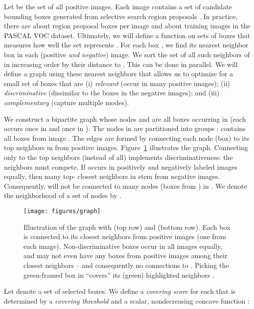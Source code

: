 \documentclass{article}
\begin{document}
Let  be the set of all positive images. Each image contains a set  of candidate bounding boxes generated from selective search region proposals \cite{selectivesearch}. In practice, there are about  region proposal boxes per image and about  training images in the PASCAL VOC dataset. Ultimately, we will define a function  on sets  of boxes that measures how well the set  represents .
For each box , we find its nearest neighbor box in each (positive \emph{and negative}) image. We sort the set  of all such neighbors of  in increasing order by their distance to . This can be done in parallel.
We will define a graph using these nearest neighbors that allows us to optimize for a small set of boxes  that are (i) \emph{relevant} (occur in many positive images); (ii) \emph{discriminative} (dissimilar to the boxes in the negative images); and (iii) \emph{complementary} (capture multiple modes).



We construct a bipartite graph  whose nodes  and  are all boxes occurring in  (each  occurs once in  and once in ). The nodes in  are partitioned into groups :  contains all boxes from image . The edges  are formed by connecting each node (box)  to its top  neighbors in  from positive images. 
Figure~\ref{fig:graph} illustrates the graph.
Connecting only to the top  neighbors (instead of all) implements discriminativeness: the neighbors must compete. If  occurs in positively and negatively labeled images equally, then many top- closest neighbors in  stem from negative images. Consequently,  will not be connected to many nodes (boxes from ) in . 
We denote the neighborhood of a set of nodes  by
.


\begin{figure}
  \centering
  \texttt{[image: figures/graph]} \vspace{-0.8cm}
  \caption{Illustration of the graph  with  (top row) and  (bottom row). Each box  is connected to its closest neighbors from positive images (one from each image). Non-discriminative boxes occur in all images equally, and may not even have any boxes from positive images among their closest neighbors -- and consequently no connections to . Picking the green-framed box  in  ``covers'' its (green) highlighted neighbors .}
  \label{fig:graph}
\end{figure}

Let  denote a set of selected boxes. We define a \emph{covering score}  for each  that is determined by a \emph{covering threshold}  and a scalar, nondecreasing concave function :
\end{document}

